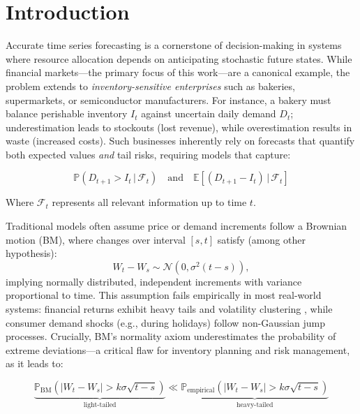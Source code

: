 \documentclass[12pt]{article}
\begin{document}
\section{Introduction}
\label{sec:introduction}

Accurate time series forecasting is a cornerstone of decision-making in systems where resource allocation depends on anticipating stochastic future states. While financial markets---the primary focus of this work---are a canonical example, the problem extends to \emph{inventory-sensitive enterprises} such as bakeries, supermarkets, or semiconductor manufacturers. For instance, a bakery must balance perishable inventory $I_t$ against uncertain daily demand $D_t$; underestimation leads to stockouts (lost revenue), while overestimation results in waste (increased costs). Such businesses inherently rely on forecasts that quantify both expected values \emph{and} tail risks, requiring models that capture:

\begin{equation}
    \mathbb{P}(D_{t+1} > I_t \,|\, \mathscr{F}_t) \quad \text{and} \quad \mathbb{E}[(D_{t+1} - I_t) \,|\, \mathscr{F}_t]
\end{equation}

Where $\mathscr{F}_t$ represents all relevant information up to time $t$.

Traditional models often assume price or demand increments follow a Brownian motion (BM)\cite{bachelier1900}\cite{wiener1923}, where changes over interval $[s, t]$ satisfy (among other hypothesis):
\begin{equation}
    W_t - W_s \sim \mathcal{N}(0, \sigma^2(t-s)), 
\end{equation}
implying normally distributed, independent increments with variance proportional to time. This assumption fails empirically in most real-world systems: financial returns exhibit heavy tails and volatility clustering \cite{cont2001}, while consumer demand shocks (e.g., during holidays) follow non-Gaussian jump processes. Crucially, BM's normality axiom underestimates the probability of extreme deviations---a critical flaw for inventory planning and risk management, as it leads to:

\begin{equation}
    \underbrace{\mathbb{P}_{\text{BM}}\left(|W_t - W_s| > k\sigma\sqrt{t-s}\right)}_{\text{light-tailed}} \ll \underbrace{\mathbb{P}_{\text{empirical}}(|W_t - W_s| > k\sigma\sqrt{t-s})}_{\text{heavy-tailed}}
\end{equation}
\end{document}
